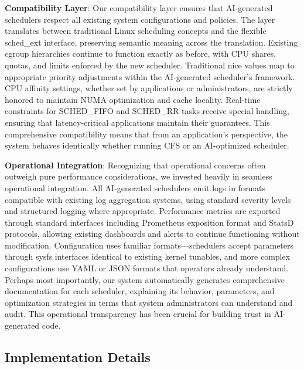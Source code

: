 \textbf{Compatibility Layer}: Our compatibility layer ensures that AI-generated schedulers respect all existing system configurations and policies. The layer translates between traditional Linux scheduling concepts and the flexible sched\_ext interface, preserving semantic meaning across the translation. Existing cgroup hierarchies continue to function exactly as before, with CPU shares, quotas, and limits enforced by the new scheduler. Traditional nice values map to appropriate priority adjustments within the AI-generated scheduler's framework. CPU affinity settings, whether set by applications or administrators, are strictly honored to maintain NUMA optimization and cache locality. Real-time constraints for SCHED\_FIFO and SCHED\_RR tasks receive special handling, ensuring that latency-critical applications maintain their guarantees. This comprehensive compatibility means that from an application's perspective, the system behaves identically whether running CFS or an AI-optimized scheduler.

\textbf{Operational Integration}: Recognizing that operational concerns often outweigh pure performance considerations, we invested heavily in seamless operational integration. All AI-generated schedulers emit logs in formats compatible with existing log aggregation systems, using standard severity levels and structured logging where appropriate. Performance metrics are exported through standard interfaces including Prometheus exposition format and StatsD protocols, allowing existing dashboards and alerts to continue functioning without modification. Configuration uses familiar formats—schedulers accept parameters through sysfs interfaces identical to existing kernel tunables, and more complex configurations use YAML or JSON formats that operators already understand. Perhaps most importantly, our system automatically generates comprehensive documentation for each scheduler, explaining its behavior, parameters, and optimization strategies in terms that system administrators can understand and audit. This operational transparency has been crucial for building trust in AI-generated code.

\subsection{Implementation Details}

